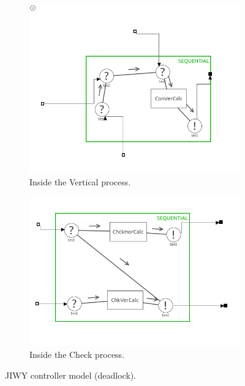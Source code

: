 \documentclass[a4paper,twoside,11pt]{article}
\begin{document}
\begin{figure}
	\begin{subfigure}{0.5\textwidth}
		\centering
		\includegraphics[width=\textwidth]{./images/4-1_ver.png}
		\caption{Inside the Vertical process.}
		\label{sub:4_1_vert}
	\end{subfigure}
	\begin{subfigure}{0.5\textwidth}
		\centering
		\includegraphics[width=\textwidth]{./images/4-1_contr.png}
		\caption{Inside the Check process.}
		\label{sub:4_1_check}
	\end{subfigure}
	\caption{JIWY controller model (deadlock).}
	\label{fig:4_1_model}
\end{figure}
\end{document}
